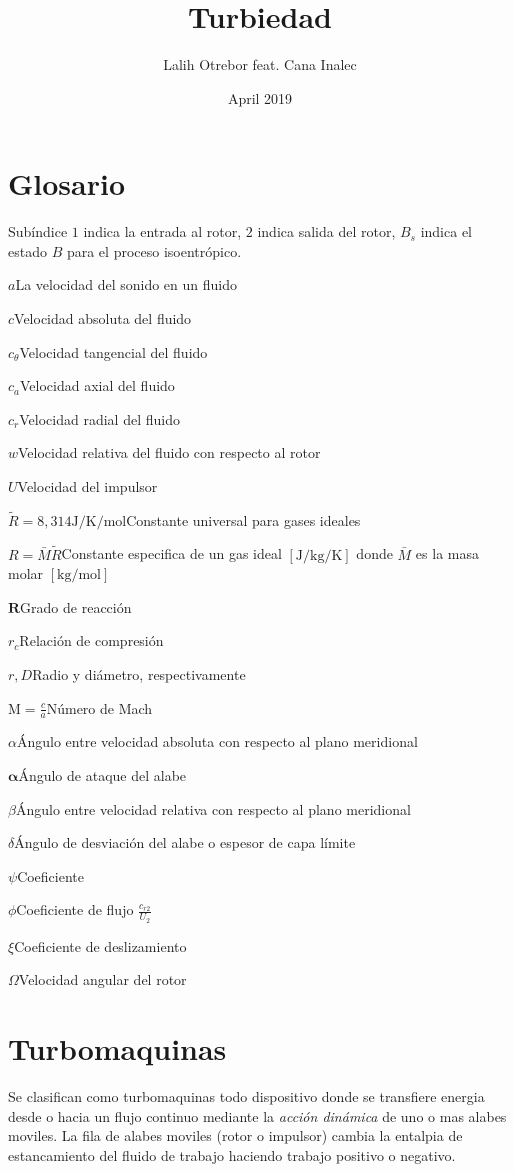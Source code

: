 \documentclass{article}
\title{Turbiedad}
\author{Lalih Otrebor feat. Cana Inalec}
\date{April 2019}
\newcommand{\glossentry}[2]{$#1$\indent #2 \par \vspace{.4cm} }
\newcommand{\sib}[1]{\ensuremath{\left[\si{#1}\right]}}
\newcommand{\attackangle}{{\ensuremath{\bm{\alpha}}}}
\newcommand{\cteuniversal}{\ensuremath{\tilde{R}}}
\newcommand{\molarmass}{\ensuremath{{\scriptstyle \bar{M}}}}
\newcommand{\speedsound}{a}
\newcommand{\ctan}[1]{\ensuremath{c_{\theta #1}}}
\newcommand{\crad}[1]{\ensuremath{c_{r #1}}}
\newcommand{\cax}[1]{\ensuremath{c_{a #1}}}
\newcommand{\Mach}{\textrm{M}}
\newcommand{\slip}{\xi}
\newcommand{\slipangle}{\ensuremath{\theta_d}}
\newcommand{\degreeofreaction}{{\bm{R}}}
\newcommand{\relcomp}{\ensuremath{r_c}}
\begin{document}
\maketitle

\section*{Glosario}
Subíndice $1$ indica la entrada al rotor, $2$ indica salida del rotor, $B_s$ indica el estado $B$ para el proceso isoentrópico.
\par

\glossentry{\speedsound}{La velocidad del sonido en un fluido}


\glossentry{c}{Velocidad absoluta del fluido}
\glossentry{\ctan{}}{Velocidad tangencial del fluido}
\glossentry{\cax{}}{Velocidad axial del fluido}

\glossentry{\crad{}}{Velocidad radial del fluido}
\glossentry{w}{Velocidad relativa del fluido con respecto al rotor}
\glossentry{U}{Velocidad del impulsor}
\glossentry{\cteuniversal=8,314 \si{\joule \per \kelvin\per \mole}}{Constante universal para gases ideales}
\glossentry{R=\molarmass\cteuniversal}{Constante especifica de un gas ideal \sib{\joule \per \kilogram \per \kelvin} donde \molarmass{} es la masa molar \sib{\kilogram \per \mole}}
\glossentry{\degreeofreaction}{Grado de reacción}
\glossentry{\relcomp}{Relación de compresión}
\glossentry{r,D}{Radio y diámetro, respectivamente}
\glossentry{\Mach=\frac{c}{\speedsound}}{Número de Mach}
\glossentry{\alpha}{Ángulo entre velocidad absoluta con respecto al plano meridional}
\glossentry{\attackangle}{Ángulo de ataque del alabe}
\glossentry{\beta}{Ángulo entre velocidad relativa con respecto al plano meridional}
\glossentry{\delta}{Ángulo de desviación del alabe o espesor de capa límite}
\glossentry{\psi}{Coeficiente}
\glossentry{\phi}{Coeficiente de flujo $\frac{\crad{2}}{U_2}$}
\glossentry{\slip}{Coeficiente de deslizamiento}
\glossentry{\Omega}{Velocidad angular del rotor}


\clearpage
\setcounter{section}{-1}

\section{Turbomaquinas}
Se clasifican como turbomaquinas todo dispositivo donde se transfiere energia desde o hacia un flujo continuo mediante la \textit{acción dinámica} de uno o mas alabes moviles. La fila de alabes moviles (rotor o impulsor) cambia la entalpia de estancamiento del fluido de trabajo haciendo trabajo positivo o negativo.
\end{document}
